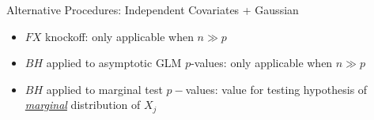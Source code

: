\begin{frame}{Alternative Procedures: Independent Covariates + Gaussian}

    {\footnotesize
    \begin{itemize}
        \item $FX$ knockoff: only applicable when $n\gg p$
        \item $BH$ applied to asymptotic GLM $p$-values: only applicable when $n\gg p$
        \item $BH$ applied to marginal test $p-$values: value for testing hypothesis of \textit{\underline{marginal}} distribution of $X_j$
    \end{itemize}   }
\end{frame}

